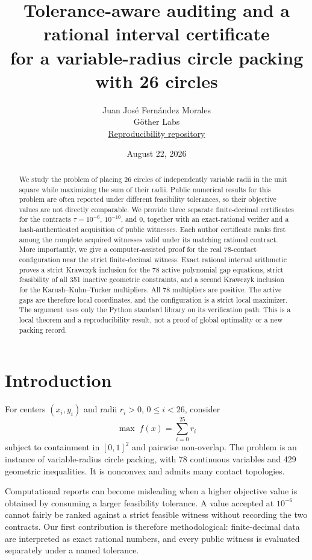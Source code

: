\documentclass[11pt]{article}
\title{Tolerance-aware auditing and a rational interval certificate\\
for a variable-radius circle packing with 26 circles}
\author{Juan Jos\'e Fern\'andez Morales\\
\small G\"other Labs\\
\small \href{https://github.com/juan-fernandez-gotherlabs/circle-packing-tolerance-audit}{Reproducibility repository}}
\date{August 22, 2026}
\begin{document}
\maketitle

\begin{abstract}
We study the problem of placing 26 circles of independently variable radii in
the unit square while maximizing the sum of their radii.  Public numerical
results for this problem are often reported under different feasibility
tolerances, so their objective values are not directly comparable.  We provide
three separate finite-decimal certificates for the contracts
$\tau=10^{-6}$, $10^{-10}$, and $0$, together with an exact-rational verifier
and a hash-authenticated acquisition of public witnesses.  Each author
certificate ranks first among the complete acquired witnesses valid under its
matching rational contract.  More importantly, we give a computer-assisted
proof for the real 78-contact configuration near the strict finite-decimal
witness.  Exact rational interval arithmetic proves
a strict Krawczyk inclusion for the 78 active polynomial gap equations,
strict feasibility of all 351 inactive geometric constraints, and a second
Krawczyk inclusion for the Karush--Kuhn--Tucker multipliers.  All 78
multipliers are positive.  The active gaps are therefore local coordinates,
and the configuration is a strict local maximizer.  The argument uses only the
Python standard library on its verification path.  This is a local theorem and
a reproducibility result, not a proof of global optimality or a new packing
record.
\end{abstract}

\section{Introduction}

For centers $(x_i,y_i)$ and radii $r_i>0$, $0\leq i<26$, consider
\begin{equation}
  \max \; f(x)=\sum_{i=0}^{25} r_i                                      \label{eq:objective}
\end{equation}
subject to containment in $[0,1]^2$ and pairwise non-overlap.  The problem is
an instance of variable-radius circle packing, with 78 continuous variables
and 429 geometric inequalities.  It is nonconvex and admits many contact
topologies.

Computational reports can become misleading when a higher objective value is
obtained by consuming a larger feasibility tolerance.  A value accepted at
$10^{-6}$ cannot fairly be ranked against a strict feasible witness without
recording the two contracts.  Our first contribution is therefore
methodological: finite-decimal data are interpreted as exact rational numbers,
and every public witness is evaluated separately under a named tolerance.
\end{document}
